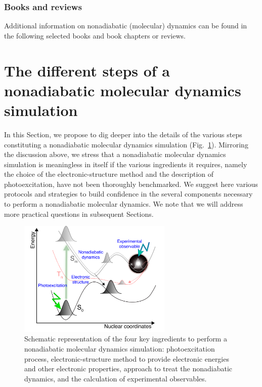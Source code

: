 \documentclass[9pt,bestpractices]{livecoms}
\begin{document}
\subsubsection{Books and reviews}
Additional information on nonadiabatic (molecular) dynamics can be found in the following selected books and book chapters\cite{gonzalez_quantum_2021,conicalintersection2004,gatti2014molecular,GONZALEZ20241,kutateladze2005computational,marxbook,tannor_book,persico2018photochemistry,tully1998modern,aimschaptercurchod} or reviews.\cite{crespo2018recent,curchod2018ab,agostini2019different,ibele2024EFreview,richardson2025mash,makhov2017ab,richings2015quantum,tully2012perspective,toddaims,WCMS:WCMS26,barbatti2011}

\section{The different steps of a nonadiabatic molecular dynamics simulation}
\label{sec:stepsofnonaddyn}

In this Section, we propose to dig deeper into the details of the various steps constituting a nonadiabatic molecular dynamics simulation (Fig.~\ref{fig:schemeglobal}). Mirroring the discussion above, we stress that a nonadiabatic molecular dynamics simulation is meaningless in itself if the various ingredients it requires, namely the choice of the electronic-structure method and the description of photoexcitation, have not been thoroughly benchmarked. We suggest here various protocols and strategies to build confidence in the several components necessary to perform a nonadiabatic molecular dynamics. We note that we will address more practical questions in subsequent Sections.


\begin{figure}[h]
\centering
\includegraphics[width=0.654\textwidth]{figures/figure_PES.png}
\caption{Schematic representation of the four key ingredients to perform a nonadiabatic molecular dynamics simulation: photoexcitation process, electronic-structure method to provide electronic energies and other electronic properties, approach to treat the nonadiabatic dynamics, and the calculation of experimental observables.}
\label{fig:schemeglobal}
\end{figure}
\end{document}
